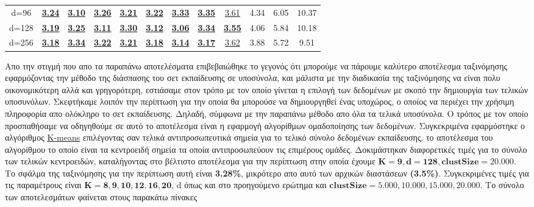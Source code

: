 \begin{table}[H]
\begin{tabular}{|c|c|c|c|c|c|c|c|c|c|c|c|}
d=96 & \underline{\textbf{3.24}} & \underline{\textbf{3.10}} & \underline{\textbf{3.26}} & \underline{\textbf{3.21}} & \underline{\textbf{3.22}} & \underline{\textbf{3.33}} & \underline{\textbf{3.35}} & \underline{3.61} & 4.34 & 6.05 & 10.37 \\
d=128 & \underline{\textbf{3.19}} & \underline{\textbf{3.25}} & \underline{\textbf{3.11}} & \underline{\textbf{3.30}} & \underline{\textbf{3.12}} & \underline{\textbf{3.06}} & \underline{\textbf{3.34}} & \underline{\textbf{3.55}} & 4.06 & 5.84 & 10.18 \\
d=256 & \underline{\textbf{3.18}} & \underline{\textbf{3.34}} & \underline{\textbf{3.22}} & \underline{\textbf{3.21}} & \underline{\textbf{3.18}} & \underline{\textbf{3.14}} & \underline{\textbf{3.17}} & \underline{3.62} & 3.88 & 5.72 & 9.51 \\
\hline
\end{tabular}
\end{table}

\par
Απο την στιγμή που απο τα παραπάνω αποτελέσματα επιβεβαιώθηκε το γεγονός ότι μπορούμε να πάρουμε καλύτερο αποτέλεσμα ταξινόμησης εφαρμόζοντας την μέθοδο της διάσπασης του σετ εκπαίδευσης σε υποσύνολα, και μάλιστα με την διαδικασία της ταξινόμησης να είναι πολυ οικονομικότερη αλλά και γρηγορότερη, εστιάσαμε στον τρόπο με τον οποίο γίνεται η επιλογή των δεδομένων με σκοπό την δημιουργία των τελικών υποσυνόλων. Σκεφτήκαμε λοιπόν την περίπτωση για την οποία θα μπορούσε να δημιουργηθεί ένας υποχώρος, ο οποίος να περιέχει την χρήσιμη πληροφορία απο ολόκληρο το σετ εκπαίδευσης. Δηλαδή, σύμφωνα με την παραπάνω μέθοδο απο όλα τα τελικά υποσύνολα. Ο τρόπος με τον οποίο προσπαθήσαμε να οδηγηθούμε σε αυτό το αποτέλεσμα είναι η εφαρμογή αλγορίθμων ομαδοποίησης των δεδομένων. Συγκεκριμένα εφαρμόστηκε ο αλγόριθμος \href{https://en.wikipedia.org/wiki/K-means_clustering}{\textlatin{K-means}}\textlatin{\cite{kmeans}} επιλέγοντας σαν τελικά αντιπροσωπευτικά σημεία για το τελικό σύνολο δεδομένων εκπαίδευσης, το αποτέλεσμα του αλγορίθμου το οποίο είναι τα κεντροειδή σημεία τα οποία αντιπροσωπεύουν τις επιμέρους ομάδες. Δοκιμάστηκαν διαφορετικές τιμές για το σύνολο των τελικών κεντροειδών, καταλήγοντας στο βέλτιστο αποτέλεσμα για την περίπτωση στην οποία έχουμε $\mathbf{K=9, d=128, clustSize=20.000}$. Το σφάλμα της ταξινόμησης για την περίπτωση αυτή είναι \textbf{3.28\%}, μικρότερο απο αυτό των αρχικών διαστάσεων \textbf{(3.5\%)}. Συγκεκριμένες τιμές για τις παραμέτρους είναι $\mathbf{K=8,9,10,12,16,20}$, \textlatin{d} όπως και στο προηγούμενο ερώτημα και $\mathbf{clustSize=5.000, 10.000, 15.000, 20.000}$. Το σύνολο των αποτελεσμάτων φαίνεται στους παρακάτω πίνακες

